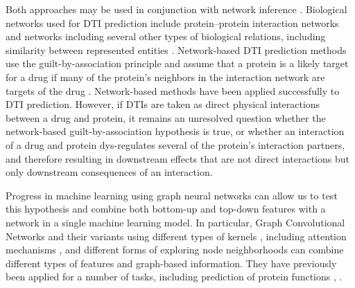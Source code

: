 \documentclass{bioinfo}
\renewcommand{\cite}{\citep}
\begin{document}
Both approaches may be used in conjunction with network inference
\cite{}. Biological networks used for DTI prediction include
protein--protein interaction networks \cite{} and networks including
several other types of biological relations, including similarity
between represented entities \cite{PREDICT}. Network-based DTI
prediction methods use the guilt-by-association principle
\cite{https://journals.plos.org/ploscompbiol/article?id=10.1371/journal.pcbi.1002444}
and assume that a protein is a likely target for a drug if many of the
protein's neighbors in the interaction network are targets of the drug
\cite{https://academic.oup.com/bioinformatics/article/32/7/1057/1743938,
  others}. Network-based methods have been applied successfully
to DTI prediction. However, if DTIs are taken as direct physical
interactions between a drug and protein, it remains an unresolved
question whether the network-based guilt-by-association hypothesis is
true, or whether an interaction of a drug and protein dys-regulates
several of the protein's interaction partners, and therefore resulting
in downstream effects that are not direct interactions but only
downstream consequences of an interaction.

Progress in machine learning using graph neural networks can allow us
to test this hypothesis and combine both bottom-up and top-down
features with a network in a single machine learning model. 
In particular, Graph Convolutional Networks \cite{GCNConv} and
their variants using different types of kernels \cite{ChebConv,
  ARMAConv}, including attention mechanisms \cite{GATConv}, and
different forms of exploring node neighborhoods \cite{APPNPConv,
  SAGEConv} can combine different types of features and graph-based
information. %
They have previously been applied for a number of tasks, including
prediction of protein functions \cite{Zitnik2017}, .
\end{document}
